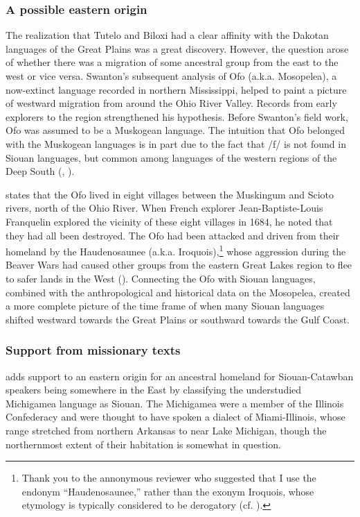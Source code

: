 \documentclass[output=paper]{LSP/langsci}
\begin{document}
\subsubsection{A possible eastern origin} The realization that Tutelo and Biloxi had a clear affinity with the Dakotan languages of the Great Plains was a great discovery. However, the question arose of whether there was a migration of some ancestral group from the east to the west or vice versa. Swanton's \citeyear{Swanton1909} subsequent analysis of Ofo (a.k.a. Mosopelea), a now-extinct language recorded in northern Mississippi, helped to paint a picture of westward migration from around the Ohio River Valley. Records from early explorers to the region strengthened his hypothesis. Before Swanton's field work, Ofo was assumed to be a Muskogean language. The intuition that Ofo belonged with the Muskogean languages is in part due to the fact that /f/ is not found in Siouan languages, but common among languages of the western regions of the Deep South (\citealt{Rankin2004ofo}, \citealt{Kaufman2014}). 

\citet{Hanna1911} states that the Ofo lived in eight villages between the Muskingum and Scioto rivers, north of the Ohio River. When French explorer Jean-Baptiste-Louis Franquelin explored the vicinity of these eight villages in 1684, he noted that they had all been destroyed. The Ofo had been attacked and driven from their homeland by the Haudenosaunee (a.k.a. Iroquois),\footnote{Thank you to the annonymous reviewer who suggested that I use the endonym ``Haudenosaunee,'' rather than the exonym Iroquois, whose etymology is typically considered to be derogatory (cf. \citealt{Day1968}).} whose aggression during the Beaver Wars had caused other groups from the eastern Great Lakes region to flee to safer lands in the West (\citealt{Swanton1952}). Connecting the Ofo with Siouan languages, combined with the anthropological and historical data on the Mosopelea, created a more complete picture of the time frame of when many Siouan languages shifted westward towards the Great Plains or southward towards the Gulf Coast. 

\subsubsection{Support from missionary texts} \citet{Koontz1995a,1995b} adds support to an eastern origin for an ancestral homeland for Siouan-Catawban speakers being somewhere in the East by classifying the understudied Michigamea language  as Siouan. The Michigamea were a member of the Illinois Confederacy and were thought to have spoken a dialect of Miami-Illinois, whose range stretched from northern Arkansas to near Lake Michigan, though the northernmost extent of their habitation is somewhat in question. 
\end{document}
